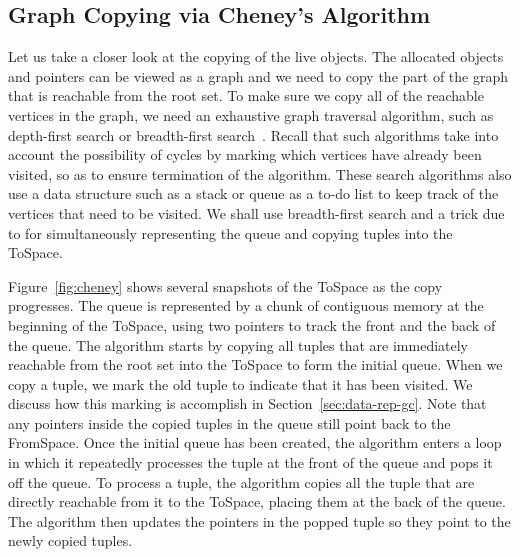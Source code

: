 \documentclass[11pt]{book}
\begin{document}
\subsection{Graph Copying via Cheney's Algorithm}
\label{sec:cheney}

Let us take a closer look at the copying of the live objects. The
allocated objects and pointers can be viewed as a graph and we need to
copy the part of the graph that is reachable from the root set. To
make sure we copy all of the reachable vertices in the graph, we need
an exhaustive graph traversal algorithm, such as depth-first search or
breadth-first search~\citep{Moore:1959aa,Cormen:2001uq}. Recall that
such algorithms take into account the possibility of cycles by marking
which vertices have already been visited, so as to ensure termination
of the algorithm. These search algorithms also use a data structure
such as a stack or queue as a to-do list to keep track of the vertices
that need to be visited. We shall use breadth-first search and a trick
due to \citet{Cheney:1970aa} for simultaneously representing the queue
and copying tuples into the ToSpace.

Figure~\ref{fig:cheney} shows several snapshots of the ToSpace as the
copy progresses. The queue is represented by a chunk of contiguous
memory at the beginning of the ToSpace, using two pointers to track
the front and the back of the queue. The algorithm starts by copying
all tuples that are immediately reachable from the root set into the
ToSpace to form the initial queue.  When we copy a tuple, we mark the
old tuple to indicate that it has been visited. We discuss how this
marking is accomplish in Section~\ref{sec:data-rep-gc}. Note that any
pointers inside the copied tuples in the queue still point back to the
FromSpace. Once the initial queue has been created, the algorithm
enters a loop in which it repeatedly processes the tuple at the front
of the queue and pops it off the queue.  To process a tuple, the
algorithm copies all the tuple that are directly reachable from it to
the ToSpace, placing them at the back of the queue. The algorithm then
updates the pointers in the popped tuple so they point to the newly
copied tuples.
\end{document}
